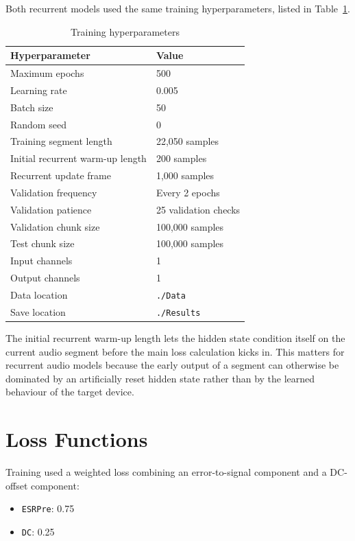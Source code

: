 Both recurrent models used the same training hyperparameters, listed in Table~\ref{tab:appendix-training-hyperparameters}.

\begin{table}[htbp]
  \centering
  \caption{Training hyperparameters}
  \label{tab:appendix-training-hyperparameters}
  \begin{tabular}{ll}
    \toprule
    Hyperparameter & Value \\
    \midrule
    Maximum epochs & 500 \\
    Learning rate & 0.005 \\
    Batch size & 50 \\
    Random seed & 0 \\
    Training segment length & 22,050 samples \\
    Initial recurrent warm-up length & 200 samples \\
    Recurrent update frame & 1,000 samples \\
    Validation frequency & Every 2 epochs \\
    Validation patience & 25 validation checks \\
    Validation chunk size & 100,000 samples \\
    Test chunk size & 100,000 samples \\
    Input channels & 1 \\
    Output channels & 1 \\
    Data location & \texttt{./Data} \\
    Save location & \texttt{./Results} \\
    \bottomrule
  \end{tabular}
\end{table}

The initial recurrent warm-up length lets the hidden state condition itself on the current audio segment before the main loss calculation kicks in. This matters for recurrent audio models because the early output of a segment can otherwise be dominated by an artificially reset hidden state rather than by the learned behaviour of the target device.

\section{Loss Functions}

Training used a weighted loss combining an error-to-signal component and a DC-offset component:

\begin{itemize}
  \item \texttt{ESRPre}: 0.75
  \item \texttt{DC}: 0.25
\end{itemize}

